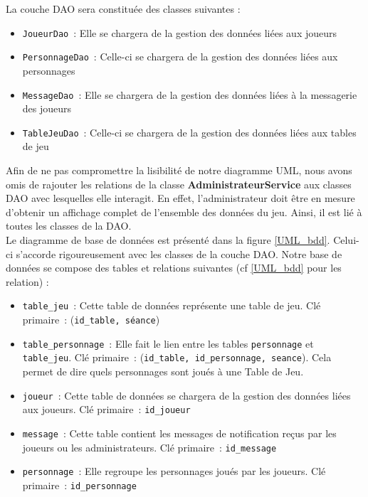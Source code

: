 \documentclass[11pt]{article}
\begin{document}
La couche DAO sera constituée des classes suivantes :

\begin{itemize}
    \item \texttt{JoueurDao}~: Elle se chargera de la gestion des données liées aux joueurs
    
    \item \texttt{PersonnageDao}~: Celle-ci se chargera de la gestion des données liées aux personnages
    
    \item \texttt{MessageDao}~: Elle se chargera de la gestion des données liées à la messagerie des joueurs
 
    \item \texttt{TableJeuDao}~: Celle-ci se chargera de la gestion des données liées aux tables de jeu

\end{itemize}

Afin de ne pas compromettre la lisibilité de notre diagramme UML, nous avons omis de rajouter les relations de la classe  \textbf{AdministrateurService} aux classes DAO avec lesquelles elle interagit. En effet, l'administrateur doit être en mesure d'obtenir un affichage complet de l'ensemble des données du jeu. Ainsi, il est lié à toutes les classes de la DAO.\\

Le diagramme de base de données est présenté dans la figure \ref{UML_bdd}. Celui-ci s'accorde rigoureusement avec les classes de la couche DAO. Notre base de données se compose des tables et relations suivantes (cf \ref{UML_bdd} pour les relation) :  

\begin{itemize}
    \item \texttt{table\_jeu}~: Cette table de données représente une table de jeu. Clé primaire~: (\texttt{id\_table, séance})
    
    \item \texttt{table\_personnage}~: Elle fait le lien entre les tables \texttt{personnage} et \texttt{table\_jeu}. Clé primaire~: (\texttt{id\_table, id\_personnage, seance}). Cela permet de dire quels personnages sont joués à une Table de Jeu.
    
    \item \texttt{joueur}~: Cette table de données se chargera de la gestion des données liées aux joueurs. Clé primaire~: \texttt{id\_joueur}
 
    \item \texttt{message}~: Cette table contient les messages de notification reçus par les joueurs ou les administrateurs. Clé primaire~: \texttt{id\_message}
    
    \item \texttt{personnage}~: Elle regroupe les personnages joués par les joueurs. Clé primaire~: \texttt{id\_personnage}

\end{itemize}
\end{document}
